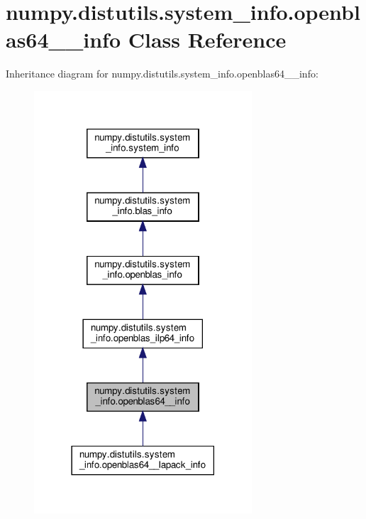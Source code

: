 \hypertarget{classnumpy_1_1distutils_1_1system__info_1_1openblas64____info}{}\section{numpy.\+distutils.\+system\+\_\+info.\+openblas64\+\_\+\+\_\+info Class Reference}
\label{classnumpy_1_1distutils_1_1system__info_1_1openblas64____info}


Inheritance diagram for numpy.\+distutils.\+system\+\_\+info.\+openblas64\+\_\+\+\_\+info\+:
\nopagebreak
\begin{figure}[H]
\begin{center}
\leavevmode
\includegraphics[width=230pt]{classnumpy_1_1distutils_1_1system__info_1_1openblas64____info__inherit__graph}
\end{center}
\end{figure}


